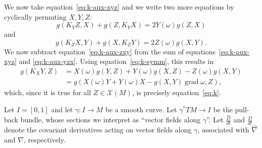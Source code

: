 \documentclass[10pt,a4paper]{exam}
\newcommand{\doit}[1]{{\color{darkgreen}\sffamily\bfseries #1}}
\DeclareMathOperator{\grad}{grad}
\newcommand{\V}{\mathscr{X}}
\newcommand{\F}{C^\infty}
\begin{document}
\begin{questions}
\begin{parts}
      \begin{solution}
        We now take equation~\eqref{eq:k-aux-xyz} and we write two more
        equations by cyclically permuting $X,Y,Z$:
        \begin{equation}\label{eq:k-aux-yzx}
          g(K_Y Z, X) + g(Z, K_Y X) = 2 Y(\omega) g(Z,X)
        \end{equation}
        and
        \begin{equation}\label{eq:k-aux-zxy}
          g(K_Z X, Y) + g(X, K_Z Y) = 2 Z(\omega) g(X,Y).
        \end{equation}
        We now subtract equation~\eqref{eq:k-aux-zxy} from the sum of
        equations~\eqref{eq:k-aux-xyz} and \eqref{eq:k-aux-yzx}.
        Using equation~\eqref{eq:k-symm}, this results in
        \begin{align*}
          g(K_XY , Z) &= X(\omega) g(Y,Z) + Y(\omega) g(X,Z) - Z(\omega)  g(X,Y)\\
                      &= g( X(\omega) Y + Y(\omega) X - g(X,Y) \grad\omega, Z),
        \end{align*}
        which, since it is true for all $Z\in\V(M)$, is precisely
        equation~\eqref{eq:k}.
      \end{solution}
  \end{parts}

  \begin{EnvUplevel}
  \end{EnvUplevel}

\question Let $I = [0,1]$ and let $\gamma: I \to M$ be a smooth curve.
  Let $\gamma^*TM \to I$ be the pull-back bundle, whose sections we
  interpret as ``vector fields along $\gamma$''.  Let $\frac{\widehat
    D}{dt}$ and $\frac{D}{dt}$ denote the covariant derivatives acting
  on vector fields along $\gamma$, associated with $\hat\nabla$ and
  $\nabla$, respectively.

\end{questions}
\end{document}
